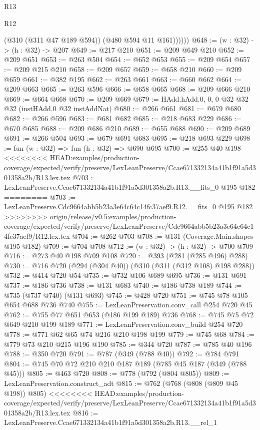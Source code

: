 \begin{lexlean}{R13}
\begin{lexlean}{R12}
\begin{coremodule}
{{{{{{{{              (@310 (@311 @47 @189 @594))
              (@480 @594 @11 @161))))))
@648 := (w : @32) -> (h : @32) -> @207
@649 := @217 @210
@651 := @209 @649 @210
@652 := @209 @651
@653 := @263 @504
@654 := @652 @653
@655 := @209 @654
@657 := @209 @215 @210
@658 := @209 @657
@659 := @658 @210
@660 := @209 @659
@661 := @382 @195
@662 := @263 @661
@663 := @660 @662
@664 := @209 @663
@665 := @263 @596
@666 := @658 @665
@668 := @209 @666 @210
@669 := @664 @668
@670 := @209 @669
@679 := HAdd.hAdd.{0, 0, 0} @32 @32 @32 (instHAdd.{0} @32 instAddNat)
@680 := @266 @661
@681 := @679 @680
@682 := @266 @596
@683 := @681 @682
@685 := @218 @683 @229
@686 := @670 @685
@688 := @209 @686 @210
@689 := @655 @688
@690 := @209 @689
@691 := @266 @504
@693 := @679 @691 @683
@695 := @218 @693 @229
@698 := fun (w : @32) => fun (h : @32) => @690 @695
@700 := @255 @40 @198
<<<<<<<< HEAD:examples/production-coverage/expected/verify/preserve/LexLeanPreserve/Ccae671332134a41b1f91a5d301358a2b/R13.lex.tex
@703 := LexLeanPreserve.Ccae671332134a41b1f91a5d301358a2b.R13.__fits_0 @195 @182
========
@703 := LexLeanPreserve.Cdc9664abb5b23a3e64c64c14fc37aef9.R12.__fits_0 @195 @182
>>>>>>>> origin/release/v0.5:examples/production-coverage/expected/verify/preserve/LexLeanPreserve/Cdc9664abb5b23a3e64c64c14fc37aef9/R12.lex.tex
@704 := @262 @703
@708 := @131 (Coverage.Main.shapes @195 @182)
@709 := @704 @708
@712 := (w : @32) -> (h : @32) -> @700 @709
@716 := @273 @40 @198 @709 @108
@720 := @393 (@281 (@285 @196) @288)
@730 := @716 @720 (@294 (@304 @40)) (@310 (@311 (@312 @108) @198 @288))
@732 := @414 @720 @54
@735 := @732 @106 @689 @695
@736 := @131 @691
@737 := @186 @736
@738 := @131 @683
@740 := @186 @738 @189
@744 := @735 (@737 @740) (@131 @693)
@745 := @428 @720
@751 := @745 @78 @105 @654 @688 @736 @740
@755 := LexLeanPreservation.conv_call @254 @720 @45
@762 := @755 @77 @651 @653 (@186 @199 @189) @736
@768 := @745 @75 @72 @649 @210 @199 @189
@771 := LexLeanPreservation.conv_build @254 @720
@778 := @771 @62 @65 @74 @216 @210 @198 @199
@779 := @745 @68
@784 := @779 @73 @210 @215 @196 @190
@785 := @344 @720
@787 := @785 @40 @196
@788 := @350 @720
@791 := @787 (@349 (@788 @40))
@792 := @784 @791
@804 := @745 @70 @72 @210 @210 @187 @189 (@785 @45 @187 (@349 (@788 @45)))
@805 := @463 @720
@808 := @778 (@792 (@804 @805))
@809 := LexLeanPreservation.construct_adt
@815 := @762 (@768 (@808 (@809 @45 @198)) @805)
<<<<<<<< HEAD:examples/production-coverage/expected/verify/preserve/LexLeanPreserve/Ccae671332134a41b1f91a5d301358a2b/R13.lex.tex
@816 := LexLeanPreserve.Ccae671332134a41b1f91a5d301358a2b.R13.__rel_1
}}}}}}}}
\end{coremodule}
\end{lexlean}
\end{lexlean}
